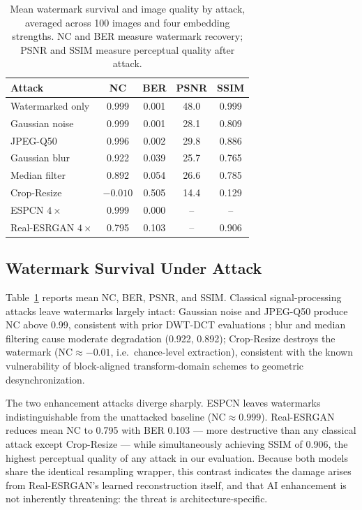 \documentclass[conference]{IEEEtran}
\begin{document}
\begin{table}[t]
\caption{Mean watermark survival and image quality by attack,
averaged across 100 images and four embedding strengths. NC and BER
measure watermark recovery; PSNR and SSIM measure perceptual quality
after attack.}
\label{tab:survival}
\centering
\begin{tabular}{lcccc}
\toprule
Attack & NC & BER & PSNR & SSIM \\
\midrule
Watermarked only & 0.999 & 0.001 & 48.0 & 0.999 \\
Gaussian noise   & 0.999 & 0.001 & 28.1 & 0.809 \\
JPEG-Q50         & 0.996 & 0.002 & 29.8 & 0.886 \\
Gaussian blur    & 0.922 & 0.039 & 25.7 & 0.765 \\
Median filter    & 0.892 & 0.054 & 26.6 & 0.785 \\
Crop-Resize      & $-0.010$ & 0.505 & 14.4 & 0.129 \\
ESPCN $4\times$  & 0.999 & 0.000 & -- & -- \\
Real-ESRGAN $4\times$ & 0.795 & 0.103 & -- & 0.906 \\
\bottomrule
\end{tabular}
\end{table}

\subsection{Watermark Survival Under Attack}
Table~\ref{tab:survival} reports mean NC, BER, PSNR, and SSIM.
Classical signal-processing attacks leave watermarks largely intact:
Gaussian noise and JPEG-Q50 produce NC above 0.99, consistent with
prior DWT-DCT evaluations \cite{alhaj2007}; blur and median filtering
cause moderate degradation (0.922, 0.892); Crop-Resize destroys the
watermark ($\mathrm{NC}\approx-0.01$, i.e.\ chance-level extraction),
consistent with the known vulnerability of block-aligned
transform-domain schemes to geometric desynchronization.

The two enhancement attacks diverge sharply. ESPCN leaves watermarks
indistinguishable from the unattacked baseline
($\mathrm{NC}\approx0.999$). Real-ESRGAN reduces mean NC to 0.795 with
BER 0.103 --- more destructive than any classical attack except
Crop-Resize --- while simultaneously achieving SSIM of 0.906, the
highest perceptual quality of any attack in our evaluation. Because
both models share the identical resampling wrapper, this contrast
indicates the damage arises from Real-ESRGAN's learned reconstruction
itself, and that AI enhancement is not inherently threatening: the
threat is architecture-specific.
\end{document}
